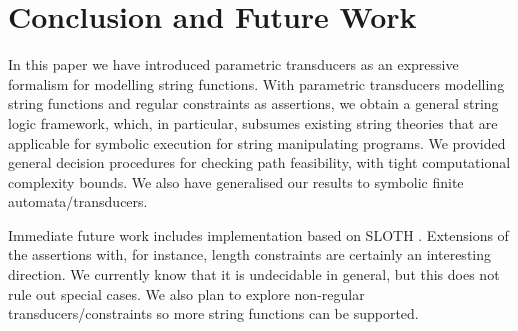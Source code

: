 \section{Conclusion and Future Work}
\label{sec:conc}

 
 
 
In this paper we have introduced parametric transducers as an expressive
formalism for modelling string functions. With parametric transducers modelling string functions and regular constraints as assertions, we obtain a general string logic framework, which, in particular, subsumes existing string theories that are applicable for symbolic execution for string manipulating programs. We provided general decision procedures for checking path feasibility, with tight computational complexity bounds. We also have generalised our results to symbolic finite automata/transducers.
 
Immediate future work includes implementation based on SLOTH \cite{HJLRV18}. Extensions of the assertions with, for instance, length constraints are certainly an interesting direction. We currently know that it is undecidable in general, but this does not rule out special cases. We also plan to explore non-regular transducers/constraints so more string functions can be supported.  